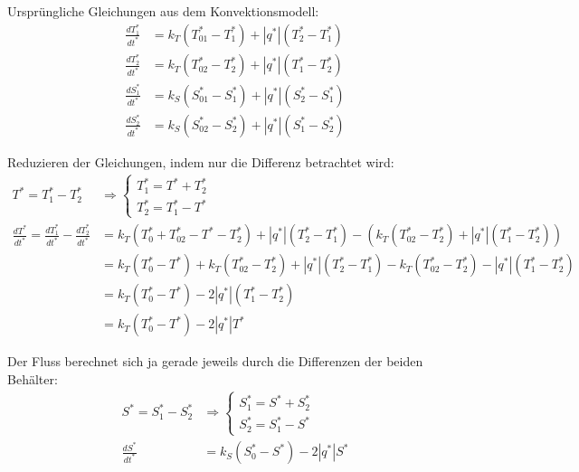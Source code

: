 \documentclass[11pt,a4paper]{article}
\begin{document}
	Ursprüngliche Gleichungen aus dem Konvektionsmodell:
	\begin{align*}
		\frac{dT^*_1}{dt^*} &= k_T\left(T^*_{01} - T^*_1\right) + \left|q^*\right|\left(T^*_2 - T^*_1\right) \\
		\frac{dT^*_2}{dt^*} &= k_T\left(T^*_{02} - T^*_2\right) + \left|q^*\right|\left(T^*_1 - T^*_2\right) \\
		\frac{dS^*_1}{dt^*} &= k_S\left(S^*_{01} - S^*_1\right) + \left|q^*\right|\left(S^*_2 - S^*_1\right) \\
		\frac{dS^*_2}{dt^*} &= k_S\left(S^*_{02} - S^*_2\right) + \left|q^*\right|\left(S^*_1 - S^*_2\right)
	\end{align*}
	
	Reduzieren der Gleichungen, indem nur die Differenz betrachtet wird:
	\begin{align*}
		T^* = T^*_1 - T^*_2 &\Rightarrow \left\{
		\begin{array}{l}
			T^*_1 = T^* + T^*_2 \\
			T^*_2 = T^*_1 - T^*
		\end{array} \right. \\
		\frac{dT^*}{dt^*} = \frac{dT^*_1}{dt^*} - \frac{dT^*_2}{dt^*} &= 
		k_T\left(T^*_{0} + T^*_{02} - T^* - T^*_2 \right) + \left|q^*\right|\left(T^*_2 - T^*_1\right)  - \left( k_T\left(T^*_{02} - T^*_2\right) + \left|q^*\right|\left(T^*_1 - T^*_2\right) \right) \\
		&= k_T\left(T^*_{0} - T^*\right) + k_T\left(T^*_{02} - T^*_2\right) + \left|q^*\right|\left(T^*_2 - T^*_1\right) - k_T\left(T^*_{02} - T^*_2\right) - \left|q^*\right|\left(T^*_1 - T^*_2\right) \\
		&= k_T\left(T^*_{0} - T^*\right) - 2\left|q^*\right|\left(T^*_1 - T^*_2\right) \\
		&= k_T\left(T^*_{0} - T^*\right) - 2\left|q^*\right|T^*
	\end{align*}
	
	Der Fluss berechnet sich ja gerade jeweils durch die Differenzen der beiden Behälter:
	\begin{align*}
		S^* = S^*_1 - S^*_2 &\Rightarrow \left\{
		\begin{array}{l}
			S^*_1 = S^* + S^*_2 \\
			S^*_2 = S^*_1 - S^*
		\end{array} \right. \\
		\frac{dS^*}{dt^*} &= k_S\left(S^*_{0} - S^*\right) - 2\left|q^*\right|S^*
	\end{align*}
	
\end{document}
